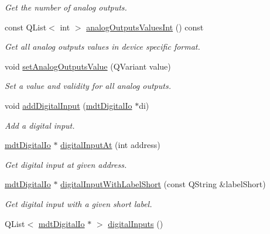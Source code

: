 \begin{DoxyCompactItemize}
\begin{DoxyCompactList}\small\item\em Get the number of analog outputs. \end{DoxyCompactList}\item 
\hypertarget{classmdt_device_ios_acdfa626fdd73783702d4e8a750b9cf84}{
const QList$<$ int $>$ \hyperlink{classmdt_device_ios_acdfa626fdd73783702d4e8a750b9cf84}{analogOutputsValuesInt} () const }
\label{classmdt_device_ios_acdfa626fdd73783702d4e8a750b9cf84}

\begin{DoxyCompactList}\small\item\em Get all analog outputs values in device specific format. \end{DoxyCompactList}\item 
\hypertarget{classmdt_device_ios_a6f96d87047d0b02a043a60a4fd6d18a2}{
void \hyperlink{classmdt_device_ios_a6f96d87047d0b02a043a60a4fd6d18a2}{setAnalogOutputsValue} (QVariant value)}
\label{classmdt_device_ios_a6f96d87047d0b02a043a60a4fd6d18a2}

\begin{DoxyCompactList}\small\item\em Set a value and validity for all analog outputs. \end{DoxyCompactList}\item 
void \hyperlink{classmdt_device_ios_a023571f5d77bd0874c08b53890a56381}{addDigitalInput} (\hyperlink{classmdt_digital_io}{mdtDigitalIo} $\ast$di)
\begin{DoxyCompactList}\small\item\em Add a digital input. \end{DoxyCompactList}\item 
\hyperlink{classmdt_digital_io}{mdtDigitalIo} $\ast$ \hyperlink{classmdt_device_ios_a78f68d0efeac0a23628f133121f28df8}{digitalInputAt} (int address)
\begin{DoxyCompactList}\small\item\em Get digital input at given address. \end{DoxyCompactList}\item 
\hyperlink{classmdt_digital_io}{mdtDigitalIo} $\ast$ \hyperlink{classmdt_device_ios_abcde6de5a0ca6d642af04c21250d6555}{digitalInputWithLabelShort} (const QString \&labelShort)
\begin{DoxyCompactList}\small\item\em Get digital input with a given short label. \end{DoxyCompactList}\item 
\hypertarget{classmdt_device_ios_ab70374d3ad06739f91388526d4203def}{
QList$<$ \hyperlink{classmdt_digital_io}{mdtDigitalIo} $\ast$ $>$ \hyperlink{classmdt_device_ios_ab70374d3ad06739f91388526d4203def}{digitalInputs} ()}
\label{classmdt_device_ios_ab70374d3ad06739f91388526d4203def}


\end{DoxyCompactItemize}
